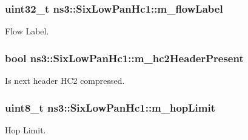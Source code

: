 \subsubsection[{\texorpdfstring{m\+\_\+flow\+Label}{m_flowLabel}}]{\setlength{\rightskip}{0pt plus 5cm}uint32\+\_\+t ns3\+::\+Six\+Low\+Pan\+Hc1\+::m\+\_\+flow\+Label\hspace{0.3cm}{\ttfamily [private]}}\hypertarget{classns3_1_1SixLowPanHc1_a58aef463f400932cf4e4decff6d79fce}{}\label{classns3_1_1SixLowPanHc1_a58aef463f400932cf4e4decff6d79fce}


Flow Label. 

\subsubsection[{\texorpdfstring{m\+\_\+hc2\+Header\+Present}{m_hc2HeaderPresent}}]{\setlength{\rightskip}{0pt plus 5cm}bool ns3\+::\+Six\+Low\+Pan\+Hc1\+::m\+\_\+hc2\+Header\+Present\hspace{0.3cm}{\ttfamily [private]}}\hypertarget{classns3_1_1SixLowPanHc1_a3f7d4c607559d9d32cf0003226561f49}{}\label{classns3_1_1SixLowPanHc1_a3f7d4c607559d9d32cf0003226561f49}


Is next header H\+C2 compressed. 

\subsubsection[{\texorpdfstring{m\+\_\+hop\+Limit}{m_hopLimit}}]{\setlength{\rightskip}{0pt plus 5cm}uint8\+\_\+t ns3\+::\+Six\+Low\+Pan\+Hc1\+::m\+\_\+hop\+Limit\hspace{0.3cm}{\ttfamily [private]}}\hypertarget{classns3_1_1SixLowPanHc1_a71d14478bd11b38fb03bb0cd867c69e6}{}\label{classns3_1_1SixLowPanHc1_a71d14478bd11b38fb03bb0cd867c69e6}


Hop Limit. 

